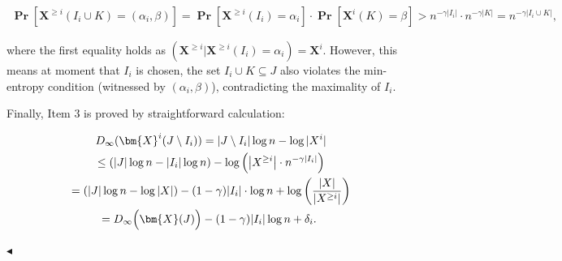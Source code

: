 \[\begin{gathered}
\operatorname*{\mathbf{Pr}}\left[\bm{X}^{\geq i}(I_{i}\cup K)=(\alpha_{i},\beta)\right]=\operatorname*{\mathbf{Pr}}\left[\bm{X}^{\geq i}(I_{i})=\alpha_{i}\right]\cdot\operatorname*{\mathbf{Pr}}\left[\bm{X}^{i}(K)=\beta\right]>n^{-\gamma|I_{i}|}\cdot n^{-\gamma|K|}=n^{-\gamma|I_{i}\cup K|},
\end{gathered}\]


where the first equality holds as $(\bm{X}^{\geq i}|\bm{X}^{\geq i}(I_{i})=\alpha_{i})=\bm{X}^{i}$.
However, this means at moment that $I_{i}$ is chosen,
the set $I_{i}\cup K\subseteq J$ also violates the min-entropy condition (witnessed by $(\alpha_{i},\beta)$), contradicting the maximality of $I_{i}$.\par




Finally, Item 3 is proved by straightforward calculation:\par


\[\begin{gathered}
\displaystyle D_{\infty}(\bm{X}^{i}(J\setminus I_{i})) \displaystyle=|J\setminus I_{i}|\log n-\log|X^{i}| \\
\displaystyle\leq(|J|\log n-|I_{i}|\log n)-\log\left(\left|X^{\geq i}\right|\cdot n^{-\gamma|I_{i}|}\right) \\
\displaystyle=(|J|\log n-\log|X|)-(1-\gamma)|I_{i}|\cdot\log n+\log\left(\frac{|X|}{\left|X^{\geq i}\right|}\right) \\
\displaystyle=D_{\infty}\Big{(}\bm{X}(J)\Big{)}-(1-\gamma)|I_{i}|\log n+\delta_{i}.\
\end{gathered}\]


$\blacktriangleleft$\par




\par



